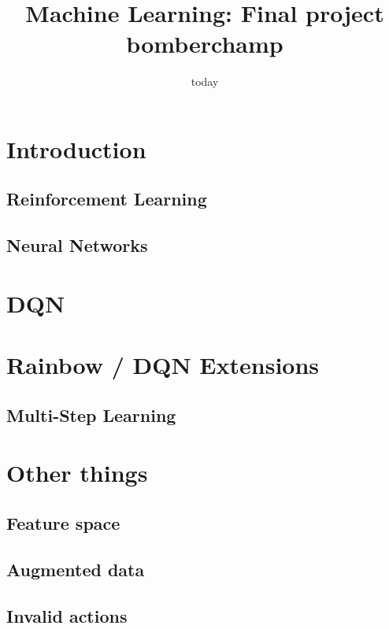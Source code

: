 \documentclass[12pt]{article}
\title{Machine Learning: Final project bomberchamp}
\date{today}
\begin{document}
\section{Introduction}


\subsection{Reinforcement Learning}

\subsection{Neural Networks}


\section{DQN}


\section{Rainbow / DQN Extensions}

\subsection{Multi-Step Learning} %
% 


\section{Other things}
\subsection{Feature space}

\subsection{Augmented data}   %

\subsection{Invalid actions} %

\end{document}
